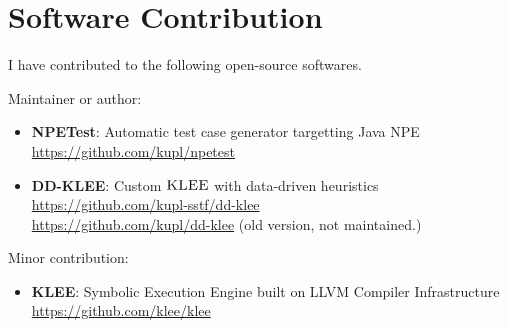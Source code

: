 \section{Software Contribution}
I have contributed to the following open-source softwares.

\vspace{1mm}

Maintainer or author:
\vspace{1mm}
{
\begin{itemize}
\item \textbf{NPETest}: Automatic test case generator targetting Java NPE \\
\url{https://github.com/kupl/npetest}
\end{itemize}
}

\vspace{2mm}
{
\begin{itemize}
\item \textbf{DD-KLEE}: Custom $\textsc{KLEE}$ with data-driven heuristics\\
\url{https://github.com/kupl-sstf/dd-klee} \\
\url{https://github.com/kupl/dd-klee} (old version, not maintained.)
\end{itemize}
}

\vspace{2mm}
Minor contribution:
\vspace{1mm}
{
\begin{itemize}
\item \textbf{KLEE}: Symbolic Execution Engine built on LLVM Compiler Infrastructure \\
\url{https://github.com/klee/klee}
\end{itemize}
}


\vspace{9mm}

